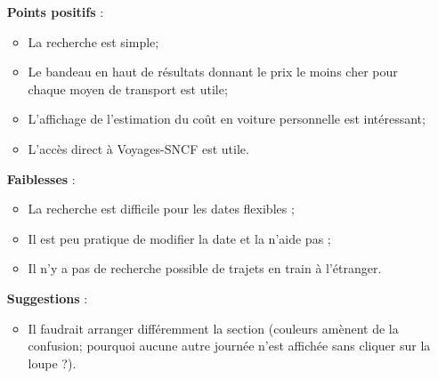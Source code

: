 \begin{itemize}
  \item [\textbf{Points positifs}] :
      \begin{itemize}
      	\item La recherche est simple;
      	\item Le bandeau en haut de r\'{e}sultats donnant le prix le moins cher pour chaque moyen de transport est utile;
      	\item L'affichage de l'estimation du co\^{u}t en voiture personnelle est int\'{e}ressant;
        \item L'acc\`{e}s direct \`{a} Voyages-SNCF est utile.
      \end{itemize}
      
  \item [\textbf{Faiblesses}] :
      \begin{itemize}
        \item La recherche est difficile pour les dates flexibles ;
		\item Il est peu pratique de modifier la date et la  n'aide pas ;
        \item Il n'y a pas de recherche possible de trajets en train \`{a} l'\'{e}tranger.
      \end{itemize}
      
  \item [\textbf{Suggestions}] :
      \begin{itemize}
      	\item Il faudrait arranger diff\'{e}remment la section  (couleurs am\`{e}nent de la confusion; pourquoi aucune autre journ\'{e}e n'est affich\'{e}e sans cliquer sur la loupe ?).
      \end{itemize}
\end{itemize}
